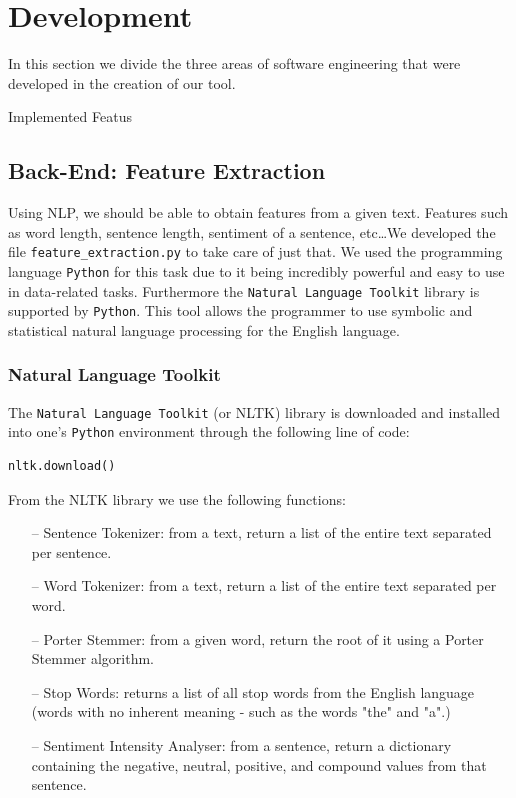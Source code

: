 \documentclass[runningheads]{llncs}
\begin{document}
\newpage
\section{Development}
In this section we divide the three areas of software engineering that were developed in the creation of our tool. 

Implemented Featus


\subsection{Back-End: Feature Extraction}

Using NLP, we should be able to obtain features from a given text. Features such as word length, sentence length, sentiment of a sentence, etc\ldots We developed the file \texttt{feature\_extraction.py} to take care of just that. We used the programming language \texttt{Python} for this task due to it being incredibly powerful and easy to use in data-related tasks. Furthermore the \texttt{Natural Language Toolkit} library is supported by \texttt{Python}. This tool allows the programmer to use symbolic and statistical natural language processing for the English language.

\subsubsection{Natural Language Toolkit}

The \texttt{Natural Language Toolkit} (or NLTK) library is downloaded and installed into one's \texttt{Python} environment through the following line of code:

\begin{verbatim}
nltk.download()
\end{verbatim}

From the NLTK library we use the following functions:
\begin{itemize}
    \item[--] Sentence Tokenizer: from a text, return a list of the entire text separated per sentence.
    \item[--] Word Tokenizer: from a text, return a list of the entire text separated per word.
    \item[--] Porter Stemmer: from a given word, return the root of it using a Porter Stemmer algorithm.
    \item[--] Stop Words: returns a list of all stop words from the English language (words with no inherent meaning - such as the words "the" and "a".)
    \item[--] Sentiment Intensity Analyser: from a sentence, return a dictionary containing the negative, neutral, positive, and compound values from that sentence.
\end{itemize}
\end{document}
